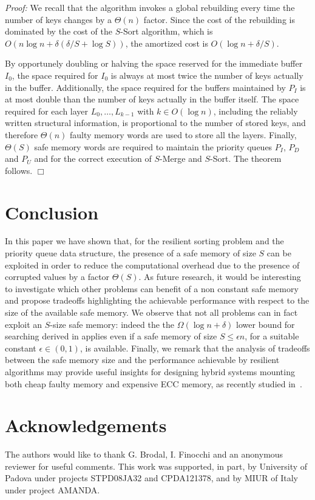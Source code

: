 \documentclass[review,number]{elsarticle}
\newcommand{\BO}[1]{{O}\left(#1\right)}
\newcommand{\BT}[1]{{\Theta}\left(#1\right)}
\newcommand{\BOM}[1]{{\Omega}\left(#1\right)}
\renewenvironment{proof}{\begin{trivlist}
                         \item[] {\em Proof:}}{\hfill $\Box$
                       \end{trivlist}}
\newcommand{\SMerge}{$S$-\textsf{Merge}}
\newcommand{\SSort}{$S$-\textsf{Sort}}
\begin{document}
\begin{proof}
We recall that the algorithm invokes a global rebuilding every time the number
of keys changes by a $\BT{n}$ factor. Since the cost of the rebuilding is
dominated by the cost of the \SSort{} algorithm, which is $\BO{n\log n+\delta
(\delta/S +  \log S)}$, the amortized cost is $\BO{\log n + \delta/S}$.

By opportunely doubling or halving the space reserved for the immediate buffer
$I_0$, the space required for $I_0$ is always at most twice the number of keys
actually in the buffer. Additionally, the space required  for the buffers 
maintained by $P_I$ is at most double than the number of keys actually in the
buffer itself. The space required for each layer $L_{0},\ldots,L_{k-1}$ with $k
\in \BO{\log n}$, including the reliably written structural information, is
proportional to the number of stored keys, and therefore $\BT{n}$ faulty
memory words are used to store all the layers. Finally, $\BT{S}$ safe memory
words are required to maintain the priority queues $P_{I}$, $P_{D}$ and $P_{U}$
and for the correct execution of \SMerge{} and \SSort. The theorem follows.
\end{proof}



\section{Conclusion}

In this paper we have shown that, for the resilient sorting problem and the
priority queue data structure, the presence of a safe memory of size
$S$ can be exploited in order to reduce the computational overhead due to the
presence of corrupted values by a factor $\BT{S}$. As future research, it
would be interesting to investigate which other problems can benefit of a non
constant safe memory and propose tradeoffs highlighting the achievable
performance with respect to the size of the available safe memory. We observe
that not all problems can in fact exploit an $S$-size safe
memory: indeed the the $\BOM{\log n +\delta}$ lower bound for searching derived
in \cite{FI08}  applies even if a safe memory of size $S\leq \epsilon n$,
for a suitable constant $\epsilon\in (0,1)$, is available. Finally, we remark
that the analysis of tradeoffs between the safe memory size and
the performance achievable by resilient algorithms may provide useful insights
for designing hybrid systems mounting both cheap faulty memory and expensive ECC
memory, as recently studied in~\cite{LI13}.


\section*{Acknowledgements}
The authors would like to thank G. Brodal, I. Finocchi and an anonymous
reviewer for useful
comments. This work was supported, in part, by University of Padova under
projects STPD08JA32 and CPDA121378, and by MIUR of Italy under project AMANDA.


%
%
\end{document}

